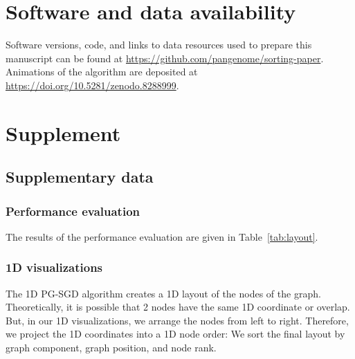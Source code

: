 \documentclass{bioinfo}
\theoremstyle{definition}
\newcommand{\red}[1]{{\textcolor{Red}{#1}}}
\newcommand{\FIXME}[1]{\red{[FIXME: #1]}}
\newcommand{\beginsupplement}{%
	\setcounter{table}{0}
	\renewcommand{\thetable}{S\arabic{table}}%
	\setcounter{figure}{0}
	\renewcommand{\thefigure}{S\arabic{figure}}%
}
\begin{document}
	\section*{Software and data availability}
	
	Software versions, code, and links to data resources used to prepare this manuscript can be found at \url{https://github.com/pangenome/sorting-paper}.
	Animations of the algorithm are deposited at \url{https://doi.org/10.5281/zenodo.8288999}.
		
	
	
	
	
	\clearpage
	\setcounter{page}{1}
	
	\beginsupplement
	
	\section{Supplement}
	
	 \subsection{Supplementary data}
	 \subsubsection{Performance evaluation}
	 \label{sec:performance}
	 The results of the performance evaluation are given in Table~\ref{tab:layout}.
	 
	\subsubsection{1D visualizations}	
	The 1D PG-SGD algorithm creates a 1D layout of the nodes of the graph.
	Theoretically, it is possible that 2 nodes have the same 1D coordinate or overlap.
	But, in our 1D visualizations, we arrange the nodes from left to right.
	Therefore, we project the 1D coordinates into a 1D node order: We sort the final layout by graph component, graph position, and node rank.
	
\end{document}

